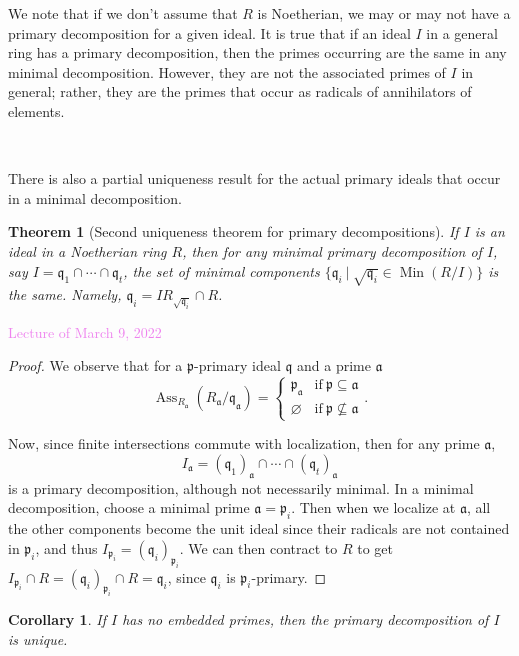 \documentclass{amsart}[12pt]
\def\Ass{\operatorname{Ass}}
\def\Min{\operatorname{Min}}
\newcommand{\Mar}[1]{\textcolor{violet}{Lecture of March #1, 2022}}
\newcommand{\p}{{\mathfrak p}}
\newcommand{\q}{{\mathfrak q}}
\numberwithin{equation}{section}
\theoremstyle{plain} %
\newtheorem{theorem}[equation]{Theorem}
\newtheorem{cor}[equation]{Corollary}
\theoremstyle{definition}
\theoremstyle{remark}
\begin{document}
We note that if we don't assume that $R$ is Noetherian, we may or may not have a primary decomposition for a given ideal. It is true that if an ideal $I$ in a general ring has a primary decomposition, then the primes occurring are the same in any minimal decomposition. However, they are not the associated primes of $I$ in general; rather, they are the primes that occur as radicals of annihilators of elements.

\

There is also a partial uniqueness result for the actual primary ideals that occur in a minimal decomposition.

\begin{theorem}[Second uniqueness theorem for primary decompositions]\label{primary decomposition uniqueness minimal components}
	If $I$ is an ideal in a Noetherian ring $R$, then for any minimal primary decomposition of $I$, say $I = \q_1 \cap \cdots \cap \q_t$, the set of \emph{minimal components} $\{ \q_i \ | \ \sqrt{\q_i} \in \Min(R/I)\}$ is the same. Namely, $\q_i = I R_{\sqrt{\q_i}} \cap R$.
\end{theorem}

\Mar{9}

\begin{proof}
	We observe that for a  $\p$-primary ideal $\q$ and a prime $\mathfrak{a}$ 
	\[ \Ass_{R_\mathfrak{a}} (R_\mathfrak{a} / \q_\mathfrak{a}) = \begin{cases} \p_\mathfrak{a} & \text{if} \ \p \subseteq \mathfrak{a} \\ \varnothing & \text{if} \ \p \not\subseteq \mathfrak{a}\end{cases}. \]
	
	Now, since finite intersections commute with localization, then for any prime $\mathfrak{a}$,
	\[ I_{\mathfrak{a}} = (\q_1)_{\mathfrak{a}} \cap \cdots \cap (\q_t)_{\mathfrak{a}}\]
	is a primary decomposition, although not necessarily minimal. In a minimal decomposition, choose a minimal prime $\mathfrak{a}=\p_i$. Then when we localize at $\mathfrak{a}$, all the other components become the unit ideal since their radicals are not contained in $\p_i$, and thus $I_{\p_i} = (\q_i)_{\p_i}$. We can then contract to $R$ to get $I_{\p_i} \cap R = (\q_i)_{\p_i} \cap R = \q_i$, since $\q_i$ is $\p_i$-primary.
\end{proof}



\begin{cor} If $I$ has no embedded primes, then the primary decomposition of $I$ is unique.
\end{cor}
\end{document}
